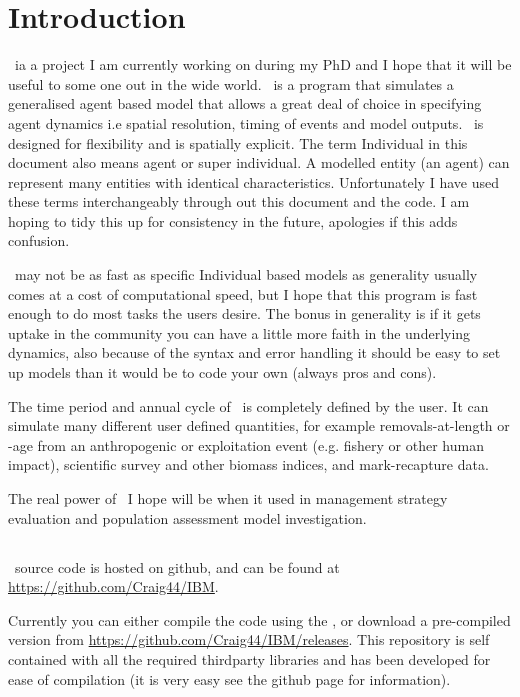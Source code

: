 \section{Introduction\label{sec:Introduction}} 

\IBM\ ia a project I am currently working on during my PhD and I hope that it will be useful to some one out in the wide world. \IBM\ is a program that simulates a generalised agent based model that allows a great deal of choice in specifying agent dynamics i.e spatial resolution, timing of events and model outputs. \IBM\ is designed for flexibility and is spatially explicit. The term Individual in this document also means agent or super individual. A modelled entity (an agent) can represent many entities with identical characteristics. Unfortunately I have used these terms interchangeably through out this document and the code. I am hoping to tidy this up for consistency in the future, apologies if this adds confusion.

\IBM\ may not be as fast as specific Individual based models as generality usually comes at a cost of computational speed, but I hope that this program is fast enough to do most tasks the users desire. The bonus in generality is if it gets uptake in the community you can have a little more faith in the underlying dynamics, also because of the syntax and error handling it should be easy to set up models than it would be to code your own (always pros and cons).

The time period and annual cycle of \IBM\ is completely defined by the user. It can simulate many different user defined quantities, for example removals-at-length or -age from an anthropogenic or exploitation event (e.g. fishery or other human impact), scientific survey and other biomass indices, and mark-recapture data.

The real power of \IBM\ I hope will be when it used in management strategy evaluation and population assessment model investigation.

\subsection{}
\IBM\ source code is hosted on github, and can be found at \url{https://github.com/Craig44/IBM}.

Currently you can either compile the code using the , or download a pre-compiled version from \url{https://github.com/Craig44/IBM/releases}. This repository is self contained with all the required thirdparty libraries and has been developed for ease of compilation (it is very easy see the github page for information). 

